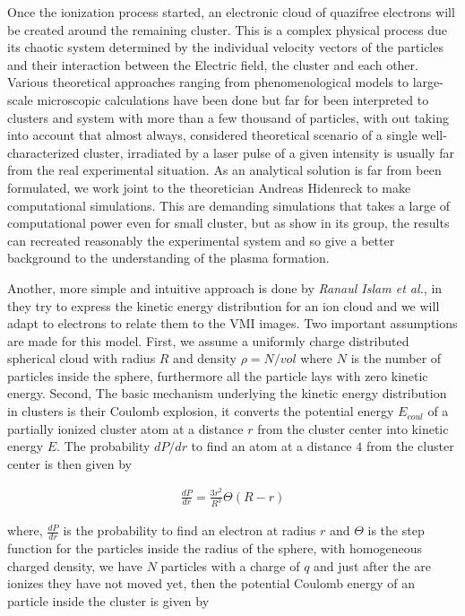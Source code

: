 Once the ionization process started, an electronic cloud of quazifree electrons will be created around the remaining cluster. This is a complex physical process due its chaotic system determined by the individual velocity vectors of the particles and their interaction between the Electric field, the cluster and each other. Various theoretical approaches ranging from phenomenological models \cite{ditmire_interaction_1996} to large-scale microscopic calculations \cite{saalmann_mechanisms_2006} have been done but far for been interpreted to clusters and system with more than a few thousand of particles, with out taking into account that almost always, considered theoretical scenario of a single well-characterized cluster, irradiated by a laser pulse of a given intensity is usually far from the real experimental situation. As an analytical solution is far from been formulated, we work joint to the theoretician Andreas Hidenreck to make computational simulations. This are demanding simulations that takes a large of computational power even for small cluster, but as show in its group, the results can recreated reasonably the experimental system and so give a better background to the understanding of the plasma formation.

Another, more simple and intuitive approach is done by  \textit{Ranaul Islam et al.}, in \cite{islam_kinetic_2006}they try to express the kinetic energy distribution for an ion cloud and we will adapt to electrons to relate them to the VMI images. Two important assumptions are made for this model. First, we assume a uniformly charge distributed spherical cloud with radius $R$ and density $\rho=N/vol$ where $N$ is the number of particles inside the sphere, furthermore all the particle lays with zero kinetic energy. Second, The basic mechanism underlying the kinetic energy distribution in clusters is their Coulomb explosion, it converts the potential energy $E_{coul}$ of a partially ionized cluster atom at a distance $r$ from the cluster center into kinetic energy $E$. The probability $dP/dr$ to find an atom at a distance $4$ from the cluster center is then given by\cite{islam_kinetic_2006}

\begin{align}
\frac{dP}{dr}=\frac{3 r^2}{R^3} \Theta (R-r)
\label{density_distribution}
\end{align}

where, $\frac{dP}{dr}$ is the probability to find an electron at radius $r$ and $\Theta$ is the step function for the particles inside the radius of the sphere, with homogeneous charged density, we have $N$ particles with a charge of $q$ and just after the are ionizes they have not moved yet, then the potential Coulomb energy of an particle inside the cluster is given by

